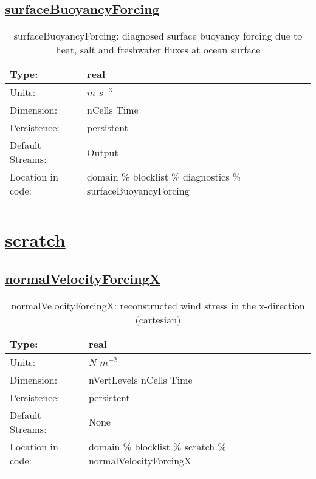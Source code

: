 \subsection[surfaceBuoyancyForcing]{\hyperref[sec:var_tab_diagnostics]{surfaceBuoyancyForcing}}
\label{subsec:var_sec_diagnostics_surfaceBuoyancyForcing}
\begin{center}
\begin{longtable}{| p{2.0in} | p{4.0in} |}
        \hline 
        Type: & real \\
        \hline 
        Units: & $m$ $s^{-3}$ \\
        \hline 
        Dimension: & nCells Time \\
        \hline 
        Persistence: & persistent \\
        \hline 
		 Default Streams: & Output  \\
        \hline 
		 Location in code: & domain \% blocklist \% diagnostics \% surfaceBuoyancyForcing \\
		 \hline 
    \caption{surfaceBuoyancyForcing: diagnosed surface buoyancy forcing due to heat, salt and freshwater fluxes at ocean surface}
\end{longtable}
\end{center}
\section[scratch]{\hyperref[sec:var_tab_scratch]{scratch}}
\label{sec:var_sec_scratch}
\subsection[normalVelocityForcingX]{\hyperref[sec:var_tab_scratch]{normalVelocityForcingX}}
\label{subsec:var_sec_scratch_normalVelocityForcingX}
\begin{center}
\begin{longtable}{| p{2.0in} | p{4.0in} |}
        \hline 
        Type: & real \\
        \hline 
        Units: & $N$ $m^{-2}$ \\
        \hline 
        Dimension: & nVertLevels nCells Time \\
        \hline 
        Persistence: & persistent \\
        \hline 
		 Default Streams: & None \\
        \hline 
		 Location in code: & domain \% blocklist \% scratch \% normalVelocityForcingX \\
		 \hline 
    \caption{normalVelocityForcingX: reconstructed wind stress in the x-direction (cartesian)}
\end{longtable}
\end{center}
